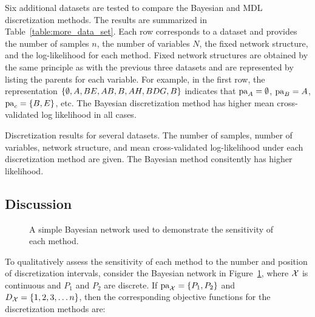 Six additional datasets \citep{Lichman_2013} are tested to compare the Bayesian and MDL discretization methods.
The results are summarized in Table~\ref{table:more_data_set}.
Each row corresponds to a dataset and provides the number of samples $n$, the number of variables $N$, the fixed network structure, and the log-likelihood for each method.
Fixed network structures are obtained by the same principle as with the previous three datasets and are represented by listing the parents for each variable.
For example, in the first row, the representation $\curly{\emptyset,A,BE,AB,B,AH,BDG,B}$ indicates that $\operatorname{pa}_A = \emptyset$, $\operatorname{pa}_B = A$, $\Pa_c = \curly{B,E}$, etc.
The Bayesian discretization method has higher mean cross-validated log likelihood in all cases.

\begin{table}[ht]
	\centering
	\caption{
		Discretization results for several datasets.
    The number of samples, number of variables, network structure, and mean cross-validated log-likelihood under each discretization method are given.
    The Bayesian method consitently has higher likelihood.
	}
  \resizebox{\textwidth}{!}{
	 
  }
	\label{table:more_data_set}
\end{table}

\subsection{Discussion}
\label{subsec:discuss_exp}

\begin{figure}[ht]
  \centering
  
  \caption{A simple Bayesian network used to demonstrate the sensitivity of each method.}
  \label{fig:exp_discuss}
\end{figure}

To qualitatively assess the sensitivity of each method to the number and position of discretization intervals, consider the Bayesian network in Figure~\ref{fig:exp_discuss}, where $\mathcal{X}$ is continuous and $P_1$ and $P_2$ are discrete.
If $\Pa_{\cX} = \curly{P_1, P_2}$ and $D_{\cX} = \curly{1,2,3, \ldots n}$, then the corresponding objective functions for the discretization methods are:

